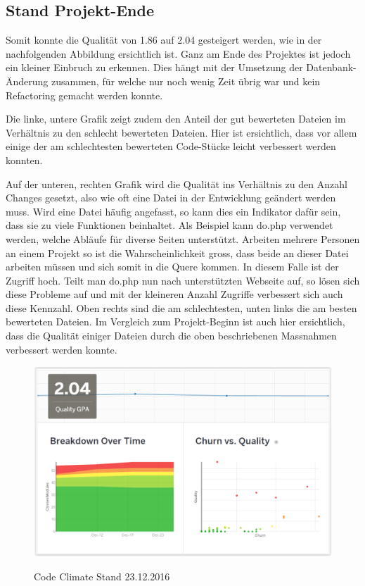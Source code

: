 \subsection{Stand Projekt-Ende}
Somit konnte die Qualität von 1.86 auf 2.04 gesteigert werden, wie in der nachfolgenden Abbildung ersichtlich ist. Ganz am Ende des Projektes ist jedoch ein kleiner Einbruch zu erkennen. Dies hängt mit der Umsetzung der Datenbank-Änderung zusammen, für welche nur noch wenig Zeit übrig war und kein \gls{Refactoring} gemacht werden konnte.

Die linke, untere Grafik zeigt zudem den Anteil der gut bewerteten Dateien im Verhältnis zu den schlecht bewerteten Dateien. Hier ist ersichtlich, dass vor allem einige der am schlechtesten bewerteten Code-Stücke leicht verbessert werden konnten.

Auf der unteren, rechten Grafik wird die Qualität ins Verhältnis zu den Anzahl Changes gesetzt, also wie oft eine Datei in der Entwicklung geändert werden muss. Wird eine Datei häufig angefasst, so kann dies ein Indikator dafür sein, dass sie zu viele Funktionen beinhaltet. Als Beispiel kann do.php verwendet werden, welche Abläufe für diverse Seiten unterstützt. Arbeiten mehrere Personen an einem Projekt so ist die Wahrscheinlichkeit gross, dass beide an dieser Datei arbeiten müssen und sich somit in die Quere kommen. In diesem Falle ist der Zugriff hoch. Teilt man do.php nun nach unterstützten Webseite auf, so lösen sich diese Probleme auf und mit der kleineren Anzahl Zugriffe verbessert sich auch diese Kennzahl. Oben rechts sind die am schlechtesten, unten links die am besten bewerteten Dateien. Im Vergleich zum Projekt-Beginn ist auch hier ersichtlich, dass die Qualität einiger Dateien durch die oben beschriebenen Massnahmen verbessert werden konnte.

\begin{figure}[H]
	\centering
	\includegraphics[width=.7\textwidth]{Images/CodeClimate_Ende.PNG}
	\caption{Code Climate Stand 23.12.2016}
	\cite{codeclimate.com}
\end{figure}

